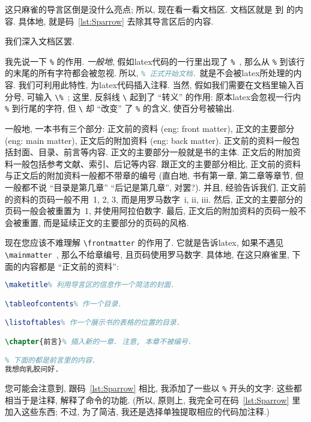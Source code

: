 这只麻雀的导言区倒是没什么亮点;
所以, 现在看一看文档区.
文档区就是
\verb`` 到 \verb`` 的内容.
具体地, 就是码~\ref{lst:Sparrow} 去除其导言区后的内容.

我们深入文档区罢.

我先说一下 \verb`%` 的作用.
\emph{一般地}, 假如\gls{latex}代码的一行里出现了 \verb`%`~,
那么从 \verb`%` 到该行的末尾的所有字符都会被忽视.
所以,
\lstinline[language=TeX]`% 正式开始文档.`
就是不会被\gls{latex}所处理的内容.
我们可利用此特性, 为\gls{latex}代码插入注释.
当然, 假如我们需要在文档里输入百分号, 可输入 \verb`\%`~;
这里, 反斜线 \verb`\` 起到了 ``转义'' 的作用:
原本\gls{latex}会忽视一行内 \verb`%` 到行尾的字符,
但 \verb`\` 却 ``改变'' 了 \verb`%` 的含义, 使百分号被输出.

一般地, 一本书有三个部分:
正文前的资料 (\gls{eng}: front matter),
正文的主要部分 (\gls{eng}: main matter),
正文后的附加资料 (\gls{eng}: back matter).
正文前的资料一般包括封面、目录、前言等内容.
正文的主要部分一般就是书的主体.
正文后的附加资料一般包括参考文献、索引、后记等内容.
跟正文的主要部分相比,
正文前的资料与正文后的附加资料一般都不带章的编号
(直白地, 书有第一章, 第二章等章节,
但一般都不说 ``目录是第几章'' ``后记是第几章'', 对罢?).
并且, 经验告诉我们, 正文前的资料的页码一般不用~1, 2, 3,
而是用罗马数字~i, ii, iii.
然后, 正文的主要部分的页码一般会被重置为~1, 并使用阿拉伯数字.
最后, 正文后的附加资料的页码一般不会被重置,
而是延续正文的主要部分的页码的风格.

现在您应该不难理解 \verb`\frontmatter` 的作用了.
它就是告诉\gls{latex}, 如果不遇见 \verb`\mainmatter`~,
那么不给章编号, 且页码使用罗马数字.
具体地, 在这只麻雀里, 下面的内容都是 ``正文前的资料'':

\begin{lstlisting}[language=TeX]
\maketitle% 利用导言区的信息作一个简洁的封面.

\tableofcontents% 作一个目录.

\listoftables% 作一个展示书的表格的位置的目录.

\chapter{前言}% 插入新的一章. 注意, 本章不被编号.

% 下面的都是前言里的内容.
我想向乳胶问好.
\end{lstlisting}

您可能会注意到, 跟码~\ref{lst:Sparrow} 相比,
我添加了一些以 \verb`%` 开头的文字:
这些都相当于是注释, 解释了命令的功能.
(所以, 原则上,
我完全可在码~\ref{lst:Sparrow} 里加入这些东西;
不过, 为了简洁, 我还是选择单独提取相应的代码加注释.)

